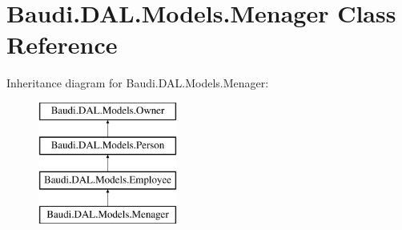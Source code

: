 \hypertarget{class_baudi_1_1_d_a_l_1_1_models_1_1_menager}{}\section{Baudi.\+D\+A\+L.\+Models.\+Menager Class Reference}
\label{class_baudi_1_1_d_a_l_1_1_models_1_1_menager}
Inheritance diagram for Baudi.\+D\+A\+L.\+Models.\+Menager\+:\begin{figure}[H]
\begin{center}
\leavevmode
\includegraphics[height=4.000000cm]{class_baudi_1_1_d_a_l_1_1_models_1_1_menager}
\end{center}
\end{figure}
